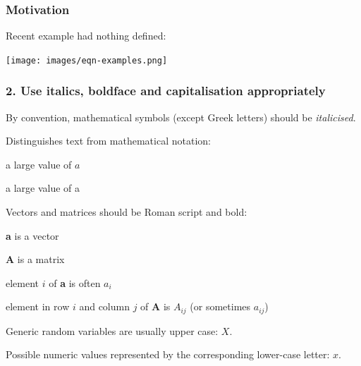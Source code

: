 
\begin{frame}
\frametitle{Motivation}

Recent example had nothing defined:

\medskip

\centering \texttt{[image: images/eqn-examples.png]}

\end{frame}




\begin{frame}
\frametitle{2. Use italics, boldface and capitalisation appropriately}

By convention, mathematical symbols (except Greek letters) should be \emph{italicised}.

Distinguishes text from mathematical notation:

\bi
\item a large value of $a$
\item a large value of a
\ei

\pause

Vectors and matrices should be Roman script and bold:
\bi
\item {\bf a} is a vector
\item {\bf A} is a matrix
\item element $i$ of {\bf a} is often $a_i$
\item element in row $i$ and column $j$ of {\bf A} is  $A_{ij}$ (or sometimes
  $a_{ij}$)
\ei


Generic random variables are usually upper case:  $X$.

Possible numeric values represented by the corresponding lower-case letter: $x$.
\end{frame}



